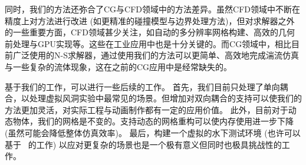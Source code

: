 同时，我们的方法还弥合了CG与CFD领域中的方法差异。虽然CFD领域中不断在精度上对方法进行改进 (如更精准的碰撞模型与边界处理方法)，但对求解器之外的一些重要方面，CFD领域甚少关注，如自动的多分辨率网格构建、高效的几何前处理与GPU实现等。这些在工业应用中也是十分关键的。而CG领域中，相比目前广泛使用的N-S求解器，通过使用我们的方法可以更简单、高效地完成湍流仿真与一些复杂的流体现象，这在之前的CG应用中是经常缺失的。

基于我们的工作，可以进行一些后续的工作。
首先，我们目前只处理了单向耦合，以处理虚拟风洞实验中最常见的场景。但增加对双向耦合的支持可以使我们的方法更加灵活，对实际工程与动画制作都有一定的应用价值。
此外，目前对于动态物体，我们的网格是不变的。支持动态的网格重构可以使内存使用进一步下降 (虽然可能会降低整体仿真效率)。
最后，构建一个虚拟的水下测试环境 (也许可以基于~\cite{Wei:2022, Wei:2023} 的工作) 以应对更复杂的场景也是一个极有意义但同时也极具挑战性的工作。